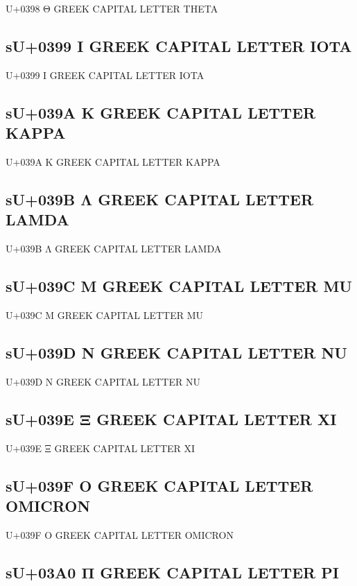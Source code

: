 U+0398 Θ GREEK CAPITAL LETTER THETA

\subsection{sU+0399 Ι GREEK CAPITAL LETTER IOTA}

U+0399 Ι GREEK CAPITAL LETTER IOTA

\subsection{sU+039A Κ GREEK CAPITAL LETTER KAPPA}

U+039A Κ GREEK CAPITAL LETTER KAPPA

\subsection{sU+039B Λ GREEK CAPITAL LETTER LAMDA}

U+039B Λ GREEK CAPITAL LETTER LAMDA

\subsection{sU+039C Μ GREEK CAPITAL LETTER MU}

U+039C Μ GREEK CAPITAL LETTER MU

\subsection{sU+039D Ν GREEK CAPITAL LETTER NU}

U+039D Ν GREEK CAPITAL LETTER NU

\subsection{sU+039E Ξ GREEK CAPITAL LETTER XI}

U+039E Ξ GREEK CAPITAL LETTER XI

\subsection{sU+039F Ο GREEK CAPITAL LETTER OMICRON}

U+039F Ο GREEK CAPITAL LETTER OMICRON

\subsection{sU+03A0 Π GREEK CAPITAL LETTER PI}


